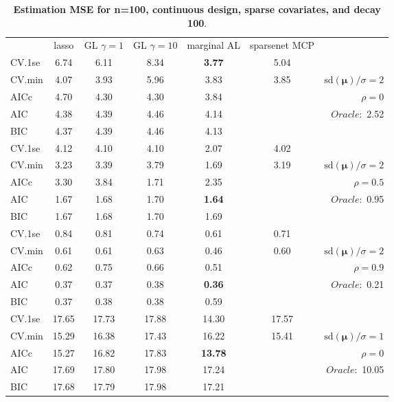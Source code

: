 \begin{table}\vspace{-.5cm}
\caption[l]{ { \bf Estimation MSE for n=100, continuous design, 
sparse covariates, and  decay  100}.}
\vspace{-.5cm}
\footnotesize{}
\begin{center}
\begin{tabular}{l*{5}{c}|r}
& lasso & GL $\gamma=1$ & GL $\gamma=10$ & marginal AL & sparsenet MCP  & \\
 \cline{1-7}
CV.1se & 6.74 & 6.11 & 8.34 & {\bf 3.77} & 5.04 & \\
CV.min & 4.07 & 3.93 & 5.96 & 3.83 & 3.85 &  $\mathrm{sd}(\mathbf{\mu})/\sigma=2$ \\
AICc & 4.70 & 4.30 & 4.30 & 3.84 & & $\rho=0$ \\
AIC & 4.38 & 4.39 & 4.46 & 4.14 & &  \multirow{2}{*}{$Oracle: $ 2.52} \\
BIC & 4.37 & 4.39 & 4.46 & 4.13 & &  \\
 \hline 
CV.1se & 4.12 & 4.10 & 4.10 & 2.07 & 4.02 & \\
CV.min & 3.23 & 3.39 & 3.79 & 1.69 & 3.19 &  $\mathrm{sd}(\mathbf{\mu})/\sigma=2$ \\
AICc & 3.30 & 3.84 & 1.71 & 2.35 & & $\rho=0.5$ \\
AIC & 1.67 & 1.68 & 1.70 & {\bf 1.64} & &  \multirow{2}{*}{$Oracle: $ 0.95} \\
BIC & 1.67 & 1.68 & 1.70 & 1.69 & &  \\
 \hline 
CV.1se & 0.84 & 0.81 & 0.74 & 0.61 & 0.71 & \\
CV.min & 0.61 & 0.61 & 0.63 & 0.46 & 0.60 &  $\mathrm{sd}(\mathbf{\mu})/\sigma=2$ \\
AICc & 0.62 & 0.75 & 0.66 & 0.51 & & $\rho=0.9$ \\
AIC & 0.37 & 0.37 & 0.38 & {\bf 0.36} & &  \multirow{2}{*}{$Oracle: $ 0.21} \\
BIC & 0.37 & 0.38 & 0.38 & 0.59 & &  \\
 \hline 
CV.1se & 17.65 & 17.73 & 17.88 & 14.30 & 17.57 & \\
CV.min & 15.29 & 16.38 & 17.43 & 16.22 & 15.41 &  $\mathrm{sd}(\mathbf{\mu})/\sigma=1$ \\
AICc & 15.27 & 16.82 & 17.83 & {\bf 13.78} & & $\rho=0$ \\
AIC & 17.69 & 17.80 & 17.98 & 17.24 & &  \multirow{2}{*}{$Oracle: $ 10.05} \\
BIC & 17.68 & 17.79 & 17.98 & 17.21 & &  \\

\end{tabular}
\end{center}
\end{table}
